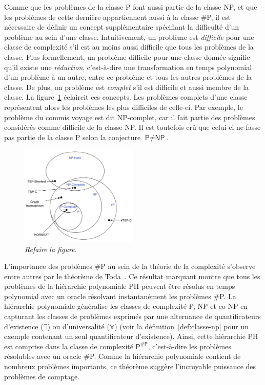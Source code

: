 
Comme que les problèmes de la classe \textsf{P} font aussi partie de la classe \textsf{NP}, et que les problèmes de cette dernière appartiennent aussi à la classe \textsf{\#P}, il est nécessaire de définir un concept supplémentaire spécifiant la difficulté d'un problème au sein d'une classe. Intuitivement, un problème est \textit{difficile} pour une classe de complexité s'il est au moins aussi difficile que tous les problèmes de la classe. Plus formellement, un problème difficile pour une classe donnée signifie qu'il existe une \textit{réduction}, c'est-à-dire une transformation en temps polynomial d'un problème à un autre, entre ce problème et tous les autres problèmes de la classe. De plus, un problème est \textit{complet} s'il est difficile et aussi membre de la classe. La figure~\ref{fig:complexity-classes} éclaircit ces concepts. Les problèmes complets d'une classe représentent alors les problèmes les plus difficiles de celle-ci. Par exemple, le problème du commis voyage est dit \textsf{NP}-complet, car il fait partie des problèmes considérés comme difficile de la classe \textsf{NP}. Il est toutefois crû que celui-ci ne fasse pas partie de la classe \textsf{P} selon la conjecture $\textsf{P} \neq \textsf{NP}$.

\begin{figure}[ht!]
    \centering
    \includegraphics[width=0.5\textwidth]{figures/complexity-classes.jpg}
    \caption[Classes de complexité]{\textcolor{mydarkred}{\textit{Refaire la figure.}}}
    \label{fig:complexity-classes}
\end{figure}

L'importance des problèmes \textsf{\#P} au sein de la théorie de la complexité s'observe entre autres par le théorème de Toda~\cite{todaPPHardPolynomialTime1991}. Ce résultat marquant montre que tous les problèmes de la hiérarchie polynomiale \textsf{PH} peuvent être résolus en temps polynomial avec un oracle résolvant instantanément les problèmes \textsf{\#P}. La hiérarchie polynomiale généralise les classes de complexité \textsf{P}, \textsf{NP} et \textsf{co-NP} en capturant les classes de problèmes exprimés par une alternance de quantificateurs d'existence ($\exists$) ou d'universalité ($\forall$) (voir la définition~\ref{def:classe-np} pour un exemple contenant un seul quantificateur d'existence). Ainsi, cette hiérarchie \textsf{PH} est comprise dans la classe de complexité $\textsf{P}^{\textsf{\#P}}$, c'est-à-dire les problèmes résolubles avec un oracle \textsf{\#P}. Comme la hiérarchie polynomiale contient de nombreux problèmes importants, ce théorème suggère l'incroyable puissance des problèmes de comptage.

